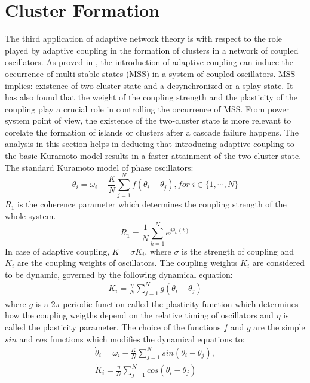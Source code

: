 \documentclass{ifacconf}
\begin{document}
\section{Cluster Formation}
The third application of adaptive network theory is with respect to the role played by adaptive coupling in the formation of clusters in a network of coupled oscillators. As proved in \citep{Kurths}, the introduction of adaptive coupling can induce the occurrence of multi-stable states (MSS) in a system of coupled oscillators. MSS implies: existence of two cluster state and a desynchronized or a splay state. It has also found that the weight of the coupling strength and the plasticity of the coupling play a crucial role in controlling the occurrence of MSS. From power system point of view, the existence of the two-cluster state is more relevant to corelate the formation of islands or clusters after a cascade failure happens. The analysis in this section helps in deducing that introducing adaptive coupling to the basic Kuramoto model results in a faster attainment of the two-cluster state.  \\
The standard Kuramoto model of phase oscillators:
\begin{equation} %
\dot \theta_{i}=\omega_{i}-\frac{K}{N} \sum_{j=1}^{N} f(\theta_{i}-\theta_{j}),  for\;i \in \lbrace1,\cdots,N \rbrace 
\end{equation}
$R_{1}$ is the coherence parameter which determines the coupling strength of the whole system.
\begin{equation}\label{eq:17}
  R_{1}=\frac{1}{N}\sum_{k=1}^{N} e^{j\theta_{k}(t)} 
\end{equation}
In case of adaptive coupling, $K=\sigma K_{i}$, where $\sigma$ is the strength of coupling and $ K_{i} $ are the coupling weights of oscillators. The coupling weights $K_{i}$ are considered to be dynamic, governed by the following dynamical equation:
\begin{align}\label{eq:18}
\dot K_{i}= \frac{\eta}{N} \sum_{j=1}^{N} g(\theta_{i}-\theta_{j})
\end{align}
where $g$ is a $2\pi$ periodic function called the plasticity function which determines how the coupling weigths depend on the relative timing of oscillators and $\eta$ is called the plasticity parameter. The choice of the functions $f$ and $g$ are the simple $ sin$ and $cos$ functions which modifies the dynamical equations to:
\begin{align}
\dot \theta_{i}=\omega_{i}-\frac{K}{N} \sum_{j=1}^{N} sin(\theta_{i}-\theta_{j}),\\ \nonumber
\dot K_{i}= \frac{\eta}{N} \sum_{j=1}^{N} cos(\theta_{i}-\theta_{j})
\end{align}
\end{document}
